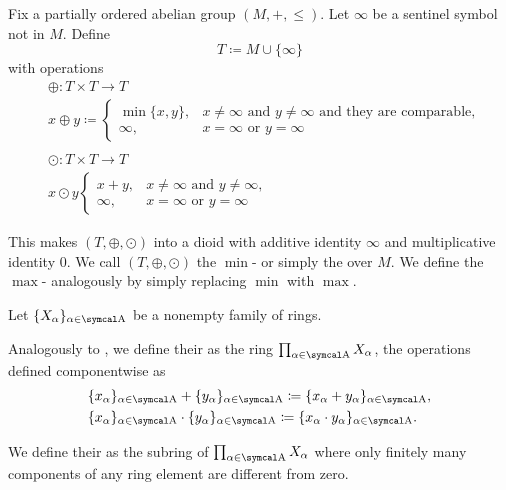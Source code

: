 \begin{definition}\label{def:tropical_semiring}\cite{nLab:tropical_semiring}
  Fix a partially ordered abelian group \( (M, +, \leq) \). Let \( \infty \) be a sentinel symbol not in \( M \). Define
  \begin{equation*}
    T \coloneqq M \cup \{ \infty \}
  \end{equation*}
  with operations
  \begin{align*}
    &\oplus: T \times T \to T \\
    &x \oplus y \coloneqq \begin{cases}
      \min \{ x, y \}, &x \neq \infty \text{ and } y \neq \infty \text{ and they are comparable}, \\
      \infty,     &x = \infty \text{ or } y = \infty
    \end{cases} \\
    \\
    &\odot: T \times T \to T \\
    &x \odot y \begin{cases}
      x + y,  &x \neq \infty \text{ and } y \neq \infty, \\
      \infty, &x = \infty \text{ or } y = \infty
    \end{cases}
  \end{align*}

  This makes \( (T, \oplus, \odot) \) into a dioid with additive identity \( \infty \) and multiplicative identity \( 0 \). We call \( (T, \oplus, \odot) \) the \( \min \)- or simply the  over \( M \). We define the \( \max \)- analogously by simply replacing \( \min \) with \( \max \).
\end{definition}

\begin{definition}\label{def:semiring_direct_product}
  Let \( \{ X_\al \}_{\al \in \CA} \) be a nonempty family of rings.

  Analogously to , we define their  as the ring \( \prod_{\al \in \CA} X_\al \), the operations defined componentwise as
  \begin{align*}
    &\{ x_\al \}_{\al \in \CA} + \{ y_\al \}_{\al \in \CA}
    \coloneqq
    \{ x_\al + y_\al \}_{\al \in \CA}, \\
    &\{ x_\al \}_{\al \in \CA} \cdot \{ y_\al \}_{\al \in \CA}
    \coloneqq
    \{ x_\al \cdot y_\al \}_{\al \in \CA}.
  \end{align*}

  We define their  as the subring of \( \prod_{\al \in \CA} X_\al \) where only finitely many components of any ring element are different from zero.
\end{definition}

